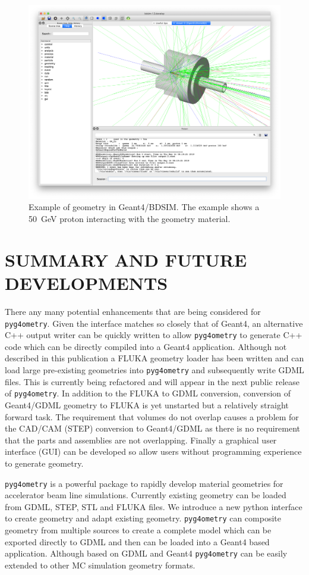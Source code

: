 \documentclass[a4paper,
               keeplastbox,   %
               ]{jacow}
\begin{document}
\begin{figure}[!htb]
   \centering
   \includegraphics*[width=.9\columnwidth]{./examples/dipole_bdsim.jpg}
   \caption{Example of geometry in Geant4/BDSIM. The example shows a 50~GeV proton interacting with the geometry material.}
   \label{fig:dipole}
\end{figure}

\section{SUMMARY AND FUTURE DEVELOPMENTS}
There any many potential enhancements that are being considered for \verb|pyg4ometry|. Given the interface matches so closely that of Geant4, 
an alternative C++ output writer can be quickly written to allow \verb|pyg4ometry| to generate C++ code which can be directly compiled into a 
Geant4 application. Although not described in this publication a FLUKA geometry loader has been written and can load large pre-existing geometries into 
\verb|pyg4ometry| and subsequently write GDML files. This is currently being refactored and will appear in the next public release of \verb|pyg4ometry|.
In addition to the FLUKA to GDML conversion, conversion of Geant4/GDML geometry to FLUKA is yet unstarted but a relatively straight forward
task. The requirement that volumes do not overlap causes a problem for the CAD/CAM (STEP) conversion to Geant4/GDML as there is no requirement 
that the parts and assemblies are not overlapping. Finally a graphical user interface (GUI) can be developed so allow users without programming 
experience to generate geometry.

\verb|pyg4ometry| is a powerful package to rapidly develop material geometries for accelerator beam line simulations. Currently existing geometry can
be loaded from GDML, STEP, STL and FLUKA files. We introduce a new python interface to create geometry and adapt existing geometry. \verb|pyg4ometry| 
can composite geometry from multiple sources to create a complete model which can be exported directly to GDML and then can be loaded into a Geant4 
based application. Although based on GDML and Geant4 \verb|pyg4ometry| can be easily extended to other MC simulation geometry formats.  
\end{document}
